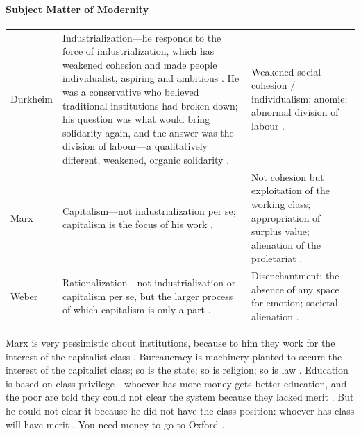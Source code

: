 \paragraph{Subject Matter of Modernity}
\vspace{6pt}
\noindent
\begin{tabularx}{\textwidth}{>{\hsize}Y >{\hsize}Y >{\hsize}Y}
\toprule
{}
 &  &  \\
\midrule
Durkheim & Industrialization---he responds to the force of industrialization, which has weakened cohesion and made people individualist, aspiring and ambitious . He was a conservative who believed traditional institutions had broken down; his question was what would bring solidarity again, and the answer was the division of labour---a qualitatively different, weakened, organic solidarity . & Weakened social cohesion / individualism; anomie; abnormal division of labour . \\
\midrule
Marx & Capitalism---not industrialization per se; capitalism is the focus of his work . & Not cohesion but exploitation of the working class; appropriation of surplus value; alienation of the proletariat . \\
\midrule
Weber & Rationalization---not industrialization or capitalism per se, but the larger process of which capitalism is only a part . & Disenchantment; the absence of any space for emotion; societal alienation . \\
\bottomrule
\end{tabularx}
\vspace{6pt}

\begin{CriticalPoint}
Marx is very pessimistic about institutions, because to him they work for the interest of the capitalist class . Bureaucracy is machinery planted to secure the interest of the capitalist class; so is the state; so is religion; so is law .
Education is based on class privilege---whoever has more money gets better education, and the poor are told they could not clear the system because they lacked merit . But he could not clear it because he did not have the class position: whoever has class will have merit . You need money to go to Oxford .
\end{CriticalPoint}

